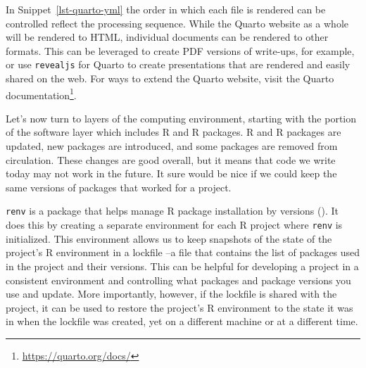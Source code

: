 \documentclass[
  letterpaper,
]{book}
\theoremstyle{definition}
\theoremstyle{remark}
\DeclareRobustCommand{\href}[2]{#2\footnote{\url{#1}}}
\begin{document}
\begin{codelisting}

\caption{\label{lst-quarto-yml}Quarto *\_quarto.yml* file}


\end{codelisting}%

In Snippet~\ref{lst-quarto-yml} the order in which each file is rendered
can be controlled reflect the processing sequence. While the Quarto
website as a whole will be rendered to HTML, individual documents can be
rendered to other formats. This can be leveraged to create PDF versions
of write-ups, for example, or use \texttt{revealjs} for Quarto to create
presentations that are rendered and easily shared on the web. For ways
to extend the Quarto website, visit the
\href{https://quarto.org/docs/}{Quarto documentation}.

Let's now turn to layers of the computing environment, starting with the
portion of the software layer which includes R and R packages. R and R
packages are updated, new packages are introduced, and some packages are
removed from circulation. These changes are good overall, but it means
that code we write today may not work in the future. It sure would be
nice if we could keep the same versions of packages that worked for a
project.

\texttt{renv} is a package that helps manage R package installation by
versions (). It does this
by creating a separate environment for each R project where
\texttt{renv} is initialized. This environment allows us to keep
snapshots of the state of the project's R environment in a lockfile --a
file that contains the list of packages used in the project and their
versions. This can be helpful for developing a project in a consistent
environment and controlling what packages and package versions you use
and update. More importantly, however, if the lockfile is shared with
the project, it can be used to restore the project's R environment to
the state it was in when the lockfile was created, yet on a different
machine or at a different time.
\end{document}
